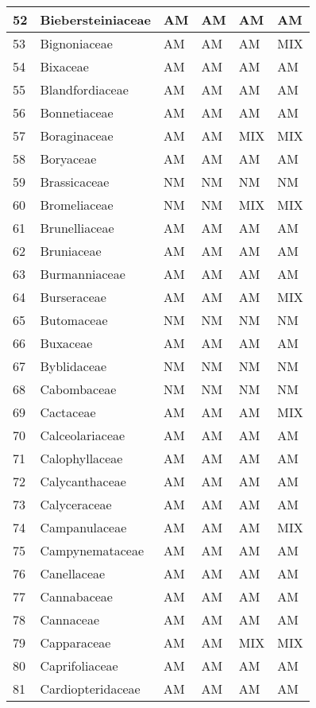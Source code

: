 \documentclass[]{article}
\begin{document}
\begin{longtable}{l|l|l|l|l|l}
\hline
52 & Biebersteiniaceae & AM & AM & AM & AM\\
\hline
53 & Bignoniaceae & AM & AM & AM & MIX\\
\hline
54 & Bixaceae & AM & AM & AM & AM\\
\hline
55 & Blandfordiaceae & AM & AM & AM & AM\\
\hline
56 & Bonnetiaceae & AM & AM & AM & AM\\
\hline
57 & Boraginaceae & AM & AM & MIX & MIX\\
\hline
58 & Boryaceae & AM & AM & AM & AM\\
\hline
59 & Brassicaceae & NM & NM & NM & NM\\
\hline
60 & Bromeliaceae & NM & NM & MIX & MIX\\
\hline
61 & Brunelliaceae & AM & AM & AM & AM\\
\hline
62 & Bruniaceae & AM & AM & AM & AM\\
\hline
63 & Burmanniaceae & AM & AM & AM & AM\\
\hline
64 & Burseraceae & AM & AM & AM & MIX\\
\hline
65 & Butomaceae & NM & NM & NM & NM\\
\hline
66 & Buxaceae & AM & AM & AM & AM\\
\hline
67 & Byblidaceae & NM & NM & NM & NM\\
\hline
68 & Cabombaceae & NM & NM & NM & NM\\
\hline
69 & Cactaceae & AM & AM & AM & MIX\\
\hline
70 & Calceolariaceae & AM & AM & AM & AM\\
\hline
71 & Calophyllaceae & AM & AM & AM & AM\\
\hline
72 & Calycanthaceae & AM & AM & AM & AM\\
\hline
73 & Calyceraceae & AM & AM & AM & AM\\
\hline
74 & Campanulaceae & AM & AM & AM & MIX\\
\hline
75 & Campynemataceae & AM & AM & AM & AM\\
\hline
76 & Canellaceae & AM & AM & AM & AM\\
\hline
77 & Cannabaceae & AM & AM & AM & AM\\
\hline
78 & Cannaceae & AM & AM & AM & AM\\
\hline
79 & Capparaceae & AM & AM & MIX & MIX\\
\hline
80 & Caprifoliaceae & AM & AM & AM & AM\\
\hline
81 & Cardiopteridaceae & AM & AM & AM & AM\\

\end{longtable}
\end{document}
